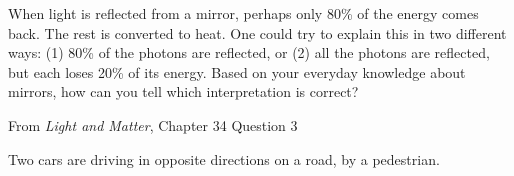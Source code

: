 \documentclass[12pt]{exam}
\begin{document}
\begin{questions}
	
\clearpage
\question When light is reflected from a mirror, perhaps only 80\% of the energy comes back. The rest is converted to heat. One could try to explain this in two different ways: (1) 80\% of the photons are reflected, or (2) all the photons are reflected, but each loses 20\% of its energy. Based on your everyday knowledge about mirrors, how can you tell which interpretation is correct?

From \textit{Light and Matter}, Chapter 34 Question 3	
\vspace{1in}	
	
	\question Two cars are driving in opposite directions on a road, by a pedestrian.
	\begin{center}
	
	\end{center}
	
\end{questions}
\end{document}
